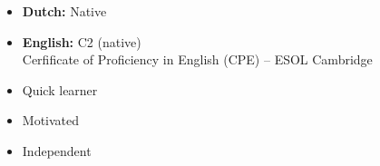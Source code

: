 %
%
%

\twocolumnsection
{
\vspace{1em}
\begin{itemize}
    \item \textbf{Dutch:} Native
    \item \textbf{English:} C2 (native)\\
    Cerfificate of Proficiency in English (CPE) – ESOL
Cambridge
\end{itemize}}
{
\vspace{1em}
\begin{itemize}
    \item Quick learner
    \item Motivated
    \item Independent
\end{itemize}}
